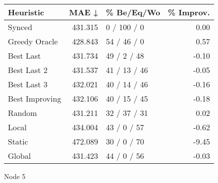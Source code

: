 \begin{tabular}{lrlr}
\toprule
\textbf{Heuristic} & \textbf{MAE ↓} & \textbf{\% Be/Eq/Wo} & \textbf{\% Improv.} \\
\midrule
            Synced &        431.315 &          0 / 100 / 0 &                0.00 \\
     Greedy Oracle &        428.843 &          54 / 46 / 0 &                0.57 \\
         Best Last &        431.734 &          49 / 2 / 48 &               -0.10 \\
       Best Last 2 &        431.537 &         41 / 13 / 46 &               -0.05 \\
       Best Last 3 &        432.021 &         40 / 14 / 46 &               -0.16 \\
    Best Improving &        432.106 &         40 / 15 / 45 &               -0.18 \\
            Random &        431.211 &         32 / 37 / 31 &                0.02 \\
             Local &        434.004 &          43 / 0 / 57 &               -0.62 \\
            Static &        472.089 &          30 / 0 / 70 &               -9.45 \\
            Global &        431.423 &          44 / 0 / 56 &               -0.03 \\
\bottomrule
\end{tabular}
\caption{Node 5}
\label{tab:iid_lr05_le1_bs4_5}
